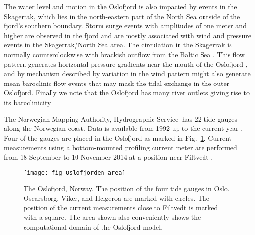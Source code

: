 The water level and motion in the Oslofjord is also impacted by events in the Skagerrak, which lies in the north-eastern part of the North Sea outside of the fjord's southern boundary. Storm surge events with amplitudes of one meter and higher are observed in the fjord and are mostly associated with wind and pressure events in the Skagerrak/North Sea area. The circulation in the Skagerrak is normally counterclockwise with brackish outflow from the Baltic Sea \cite[]{rodhe96,svendsen96}. This flow pattern generates horizontal pressure gradients near the mouth of the Oslofjord \cite[]{baals90}, and by mechanism described by \cite{klinck81} variation in the wind pattern might also generate mean baroclinic flow events that may mask the tidal exchange in the outer Oslofjord.
Finally we note that the Oslofjord has many river outlets giving rise to its baroclinicity. 

The Norwegian Mapping Authority, Hydrographic Service, has 22 tide gauges along the Norwegian coast. Data is available from 1992 up to the current year \cite[]{tide16}. Four of the gauges are placed in the Oslofjord as marked in  Fig.~\ref{fig:area1}.
Current measurements using a bottom-mounted profiling current meter are performed from 18 September to 10 November 2014 at a position near Filtvedt \cite[]{hjelmervik17}.

\begin{figure}[htb]
\centering
\texttt{[image: fig\_Oslofjorden\_area]}
\caption{The Oslofjord, Norway. The position of the four tide gauges in Oslo, Oscarsborg, Viker, and Helgeroa are marked with circles. The position of the current measurements close to Filtvedt is marked with a square. The area shown also conveniently shows the computational domain of the Oslofjord model.}
\label{fig:area1}
\end{figure}


